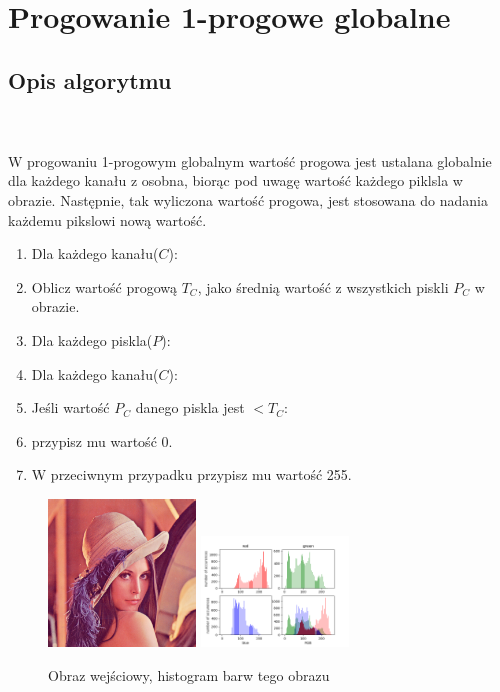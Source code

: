 \documentclass[final,a4paper,openany,12pt]{mwbk}
\begin{document}
\newpage




\section{Progowanie 1-progowe globalne}
\subsection*{Opis algorytmu}
\hfill
\\\\
\indent W progowaniu 1-progowym globalnym wartość progowa jest ustalana globalnie dla każdego kanału z osobna, biorąc pod uwagę wartość każdego piklsla w obrazie. Następnie, tak wyliczona wartość progowa, jest stosowana do nadania każdemu pikslowi nową wartość.
\begin{enumerate}
	\item Dla każdego kanału($C$):
	\item Oblicz wartość progową $T_C$, jako średnią wartość z wszystkich piskli $P_C$ w obrazie.
	\item Dla każdego piskla($P$):
	\item Dla każdego kanału($C$):
	\item Jeśli wartość $P_C$ danego piskla jest $< T_C$:
	\item przypisz mu wartość $0$.
	\item W przeciwnym przypadku przypisz mu wartość 255.
\end{enumerate}

\begin{figure}[H]
	\begin{center}
		\includegraphics[width=0.35\textwidth]{lena_color}
		\includegraphics[width=0.35\textwidth]{lena_color_histogram}
	\end{center}
	\caption{Obraz wejściowy, histogram barw tego obrazu}
\end{figure}
\end{document}
